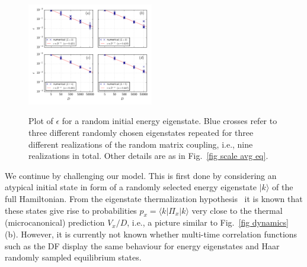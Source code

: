 \documentclass[pre,onecolumn,12pt,aps,longbibliography,nofootinbib]{revtex4-2}
\newcommand{\lr}[1]{{\langle {#1}\rangle}}
\begin{document}
\begin{figure}[t]
 \centering\includegraphics[width=0.49\textwidth,clip=true]{eps_001_eig.pdf}
 \label{fig scale avg eig}\vspace{-0.5cm}
 \caption{Plot of $\epsilon$ for a random initial energy eigenstate. Blue crosses refer to three different randomly chosen eigenstates repeated for three different realizations of the random matrix coupling, i.e., nine realizations in total. Other details are as in Fig.~\ref{fig scale avg eq}. }
\end{figure}

We continue by challenging our model. This is first done by considering an atypical initial state in form of a
randomly selected energy eigenstate $|k\rangle$ of the full Hamiltonian. From the eigenstate thermalization
hypothesis~\cite{DeutschPRA1991, SrednickiPRE1994, SrednickiJPA1999, DAlessioEtAlAP2016, DeutschRPP2018,
ReimannDabelowPRE2021} it is known that these states give rise to probabilities $p_x = \lr{k|\Pi_x|k}$ very close to
the thermal (microcanonical) prediction $V_x/D$, i.e., a picture similar to Fig.~\ref{fig dynamics} (b). However,
it is currently not known whether multi-time correlation functions such as the DF display the same behaviour for 
energy eigenstates and Haar randomly sampled equilibrium states.
\end{document}
